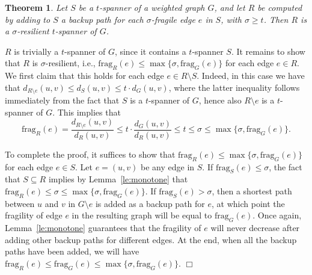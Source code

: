 \documentclass{article}
\newcommand{\dist}          {d}
\newcommand{\frag}          {\mathrm{frag}}
\newtheorem{theorem}{Theorem}
\newcommand{\qed}{\hfill \ensuremath{\Box}}
\newenvironment{proof}{\vspace{1ex}\noindent{\bf Proof.}\hspace{0.5em}}
	{\hfill\qed\vspace{2ex}}
\begin{document}
\begin{theorem}\label{th:correctweigthed}
Let $S$ be a $t$-spanner of a weighted graph $G$, and let 
$R$ be computed by adding to $S$ a backup path for each $\sigma$-fragile edge $e$ in $S$, with $\sigma \geq t$. Then $R$ is a $\sigma$-resilient $t$-spanner of $G$.
\end{theorem}
\begin{proof} 
$R$ is trivially a $t$-spanner of $G$, since it contains a
$t$-spanner $S$. It remains to show that $R$ is $\sigma$-resilient, i.e., 
$\frag_R(e) \leq \max\{\sigma, \frag_G(e)\}$ for each edge $e \in R$.
We first claim that this holds for each edge $e \in R \setminus S$.
Indeed, in this case we have that
$\dist_{R\setminus e}(u,v) \leq \dist_{S}(u,v) \leq t \cdot \dist_G(u,v)$, where the latter inequality follows immediately from the fact that $S$ is a $t$-spanner of $G$, hence also $R \setminus e$ is a $t$-spanner of $G$. This implies that
		$$\frag_R(e) = \frac{\dist_{R \setminus e}(u,v)}{\dist_R(u,v)} \leq t\cdot\frac{\dist_G(u,v)}{\dist_R(u,v)}
		\leq t \leq \sigma \leq \max\{\sigma, \frag_G(e)\}.$$


To complete the proof, it suffices to show that $\frag_R(e) \leq \max\{\sigma, \frag_G(e)\}$ for each edge $e \in S$. 
Let $e=(u,v)$ be any edge in $S$. If $\frag_S(e)\leq\sigma$, the fact that $S\subseteq R$ implies by Lemma~\ref{le:monotone} that $\frag_R(e)\leq\sigma\leq \max\{\sigma, \frag_G(e)\}$. If $\frag_S(e) > \sigma$, then 
a shortest path between $u$ and $v$ in $G\setminus e$ is added as 
a backup path for $e$, at which point the fragility of edge $e$ in the resulting graph will be equal to $\frag_G(e)$. Once again, Lemma~\ref{le:monotone} guarantees that the fragility of $e$ will never decrease after adding other backup paths for different edges. At the end, when all the backup paths have been added, we will have $\frag_R(e) \leq \frag_G(e)\leq \max\{\sigma, \frag_G(e)\}$.
\end{proof}
\end{document}
